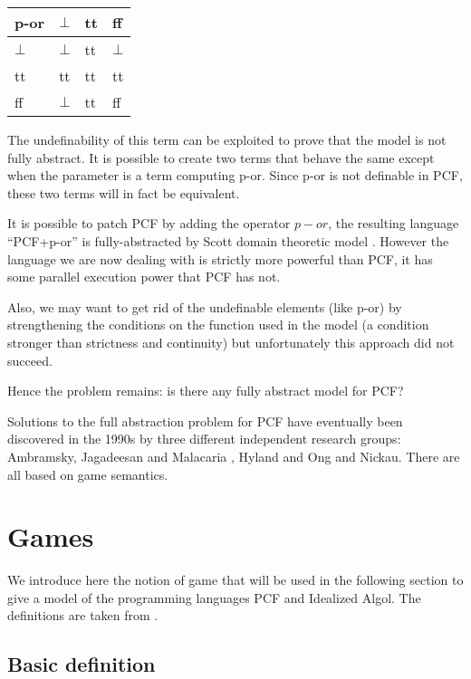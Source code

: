 \begin{center}
\begin{tabular}{l|lll}
p-or  & $\bot$ & tt & ff \\ \hline
$\bot$ & $\bot$ & tt & $\bot$\\
tt & tt & tt & tt\\
ff & $\bot$ & tt & ff\\
\end{tabular}
\end{center}

The undefinability of this term can be exploited to prove that the
model is not fully abstract. It is possible to create two terms that
behave the same except when the parameter is a term computing p-or.
Since p-or is not definable in PCF, these two terms will in fact be
equivalent.

It is possible to patch PCF by adding the operator $p-or$, the
resulting language ``PCF+p-or'' is fully-abstracted by Scott domain
theoretic model \citep{DBLP:journals/tcs/Plotkin77}. However the language we are now dealing with is
strictly more powerful than PCF, it has some parallel execution
power that PCF has not.

Also, we may want to get rid of the undefinable elements (like p-or)
by strengthening the conditions on the function used in the model (a
condition stronger than strictness and continuity) but unfortunately
this approach did not succeed.

Hence the problem remains: is there any fully abstract model for
PCF?

Solutions to the full abstraction problem for PCF have eventually
been discovered in the 1990s by three different independent research
groups: Ambramsky, Jagadeesan and Malacaria \cite{abramsky94full},
Hyland and Ong \cite{hylandong_pcf} and Nickau. There are all based
on game semantics.


\section{Games}

\label{sec:catgames}

We introduce here the notion of game that will be used in the following section to give a model of the programming languages
PCF and Idealized Algol. The definitions are taken from \cite{abramsky:game-semantics, hylandong_pcf, abramsky94full}.

\subsection{Basic definition}

